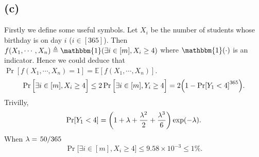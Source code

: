 \documentclass{article}
\begin{document}
\subsection*{(c)}
Firstly we define some useful symbols.
Let $X_i$ be the number of students whose birthday is on day  $i$ ($i\in[365]$). 
Then $f(X_1,\cdots,X_n)\defeq\mathbbm{1}(\exists i\in[m], X_i\ge 4)$ where $\mathbbm{1}(\cdot)$ is an indicator.
Hence we could deduce that $\Pr[f(X_1,\cdots,X_n)=1]=\mathbb{E}[f(X_1,\cdots,X_n)]$.
\[
	\Pr\Big[\exists i\in[m],X_i\ge 4\Big]
	\le 
	2\Pr\Big[\exists i\in[m],Y_i\ge 4\Big]=2\qty(1-\Pr[Y_1<4]^{365})
.\] 
Trivilly,
\[
	\Pr[Y_1<4]=\qty(1+\lambda+\frac{\lambda^2}{2}+\frac{\lambda^3}{6})\exp(-\lambda)
.\] 
When $\lambda=\flatfrac{50}{365}$
\[
    \Pr\Big[\exists i\in[m],X_i\ge 4\Big]
	\le 9.58\times 10^{-3}\le 1\%
.\] 
\end{document}
